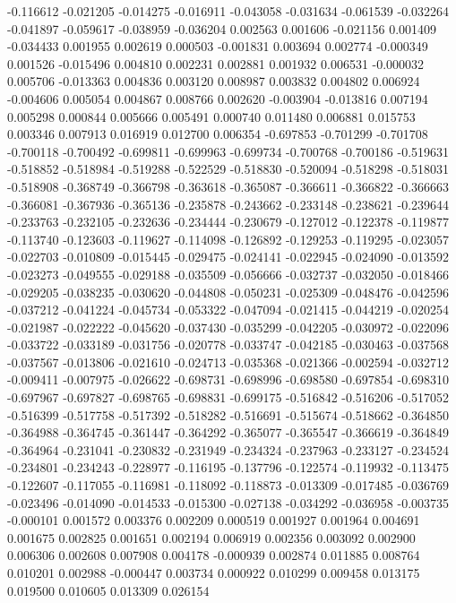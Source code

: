 -0.116612
-0.021205
-0.014275
-0.016911
-0.043058
-0.031634
-0.061539
-0.032264
-0.041897
-0.059617
-0.038959
-0.036204
0.002563
0.001606
-0.021156
0.001409
-0.034433
0.001955
0.002619
0.000503
-0.001831
0.003694
0.002774
-0.000349
0.001526
-0.015496
0.004810
0.002231
0.002881
0.001932
0.006531
-0.000032
0.005706
-0.013363
0.004836
0.003120
0.008987
0.003832
0.004802
0.006924
-0.004606
0.005054
0.004867
0.008766
0.002620
-0.003904
-0.013816
0.007194
0.005298
0.000844
0.005666
0.005491
0.000740
0.011480
0.006881
0.015753
0.003346
0.007913
0.016919
0.012700
0.006354
-0.697853
-0.701299
-0.701708
-0.700118
-0.700492
-0.699811
-0.699963
-0.699734
-0.700768
-0.700186
-0.519631
-0.518852
-0.518984
-0.519288
-0.522529
-0.518830
-0.520094
-0.518298
-0.518031
-0.518908
-0.368749
-0.366798
-0.363618
-0.365087
-0.366611
-0.366822
-0.366663
-0.366081
-0.367936
-0.365136
-0.235878
-0.243662
-0.233148
-0.238621
-0.239644
-0.233763
-0.232105
-0.232636
-0.234444
-0.230679
-0.127012
-0.122378
-0.119877
-0.113740
-0.123603
-0.119627
-0.114098
-0.126892
-0.129253
-0.119295
-0.023057
-0.022703
-0.010809
-0.015445
-0.029475
-0.024141
-0.022945
-0.024090
-0.013592
-0.023273
-0.049555
-0.029188
-0.035509
-0.056666
-0.032737
-0.032050
-0.018466
-0.029205
-0.038235
-0.030620
-0.044808
-0.050231
-0.025309
-0.048476
-0.042596
-0.037212
-0.041224
-0.045734
-0.053322
-0.047094
-0.021415
-0.044219
-0.020254
-0.021987
-0.022222
-0.045620
-0.037430
-0.035299
-0.042205
-0.030972
-0.022096
-0.033722
-0.033189
-0.031756
-0.020778
-0.033747
-0.042185
-0.030463
-0.037568
-0.037567
-0.013806
-0.021610
-0.024713
-0.035368
-0.021366
-0.002594
-0.032712
-0.009411
-0.007975
-0.026622
-0.698731
-0.698996
-0.698580
-0.697854
-0.698310
-0.697967
-0.697827
-0.698765
-0.698831
-0.699175
-0.516842
-0.516206
-0.517052
-0.516399
-0.517758
-0.517392
-0.518282
-0.516691
-0.515674
-0.518662
-0.364850
-0.364988
-0.364745
-0.361447
-0.364292
-0.365077
-0.365547
-0.366619
-0.364849
-0.364964
-0.231041
-0.230832
-0.231949
-0.234324
-0.237963
-0.233127
-0.234524
-0.234801
-0.234243
-0.228977
-0.116195
-0.137796
-0.122574
-0.119932
-0.113475
-0.122607
-0.117055
-0.116981
-0.118092
-0.118873
-0.013309
-0.017485
-0.036769
-0.023496
-0.014090
-0.014533
-0.015300
-0.027138
-0.034292
-0.036958
-0.003735
-0.000101
0.001572
0.003376
0.002209
0.000519
0.001927
0.001964
0.004691
0.001675
0.002825
0.001651
0.002194
0.006919
0.002356
0.003092
0.002900
0.006306
0.002608
0.007908
0.004178
-0.000939
0.002874
0.011885
0.008764
0.010201
0.002988
-0.000447
0.003734
0.000922
0.010299
0.009458
0.013175
0.019500
0.010605
0.013309
0.026154
